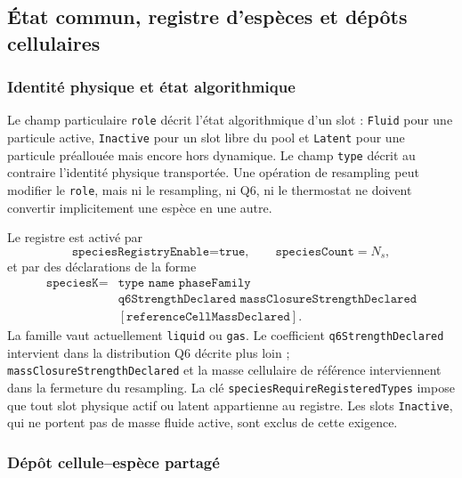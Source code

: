 \documentclass[11pt,a4paper]{article}
\begin{document}
\subsection{État commun, registre d'espèces et dépôts cellulaires}

\subsubsection{Identité physique et état algorithmique}

Le champ particulaire \texttt{role} décrit l'état algorithmique d'un slot : \texttt{Fluid} pour une particule active, \texttt{Inactive} pour un slot libre du pool et \texttt{Latent} pour une particule préallouée mais encore hors dynamique. Le champ \texttt{type} décrit au contraire l'identité physique transportée. Une opération de resampling peut modifier le \texttt{role}, mais ni le resampling, ni Q6, ni le thermostat ne doivent convertir implicitement une espèce en une autre.

Le registre est activé par
\begin{equation}
  \texttt{speciesRegistryEnable=true},
  \qquad \texttt{speciesCount}=N_s,
\end{equation}
et par des déclarations de la forme
\begin{equation}
\begin{aligned}
  \texttt{speciesK} ={}& \texttt{type name phaseFamily}\\
  &\texttt{q6StrengthDeclared massClosureStrengthDeclared}\\
  &[\texttt{referenceCellMassDeclared}].
\end{aligned}
\end{equation}
La famille vaut actuellement \texttt{liquid} ou \texttt{gas}. Le coefficient \texttt{q6StrengthDeclared} intervient dans la distribution Q6 décrite plus loin ; \texttt{massClosureStrengthDeclared} et la masse cellulaire de référence interviennent dans la fermeture du resampling. La clé \texttt{speciesRequireRegisteredTypes} impose que tout slot physique actif ou latent appartienne au registre. Les slots \texttt{Inactive}, qui ne portent pas de masse fluide active, sont exclus de cette exigence.

\subsubsection{Dépôt cellule--espèce partagé}
\end{document}
